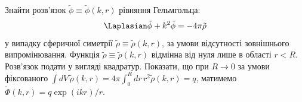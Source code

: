 \begin{problem}%
Знайти розв'язок \( \tilde\phi \equiv \tilde\phi(k, r) \) рівняння Гельмгольца:
\begin{equation*}
	\Laplasian \tilde\phi + k^2 \tilde\phi = -4\pi\tilde\rho
\end{equation*}
у випадку сферичної симетрії \( \tilde\rho \equiv \tilde\rho(k, r) \), за умови відсутності зовнішнього випромінювання.
Функція \( \tilde\rho \equiv \tilde\rho(k, r) \) відмінна від нуля лише в області \( r < R \). Розв'язок подати у
вигляді квадратур. Показати, що при \( R \to 0 \) за умови фіксованого \( \int dV \, \tilde\rho(k, r) = 4\pi \int_0^R dr
\, r^2 \tilde\rho(k, r) = q \), матимемо \( \tilde\Phi(k, r) = q \exp(ikr) / r \).
\end{problem}

